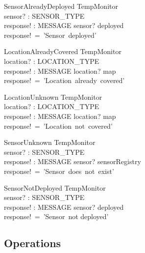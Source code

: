 \documentclass[12pt]{article}
\begin{document}
		
		
		\begin{schema}{SensorAlreadyDeployed}
			\Xi TempMonitor\\
			sensor? : SENSOR\_TYPE\\
			response! : MESSAGE
			\where
			sensor? \in deployed\\
			response!~=~'Sensor~deployed'\\
		\end{schema}
		
		
		
		\begin{schema}{LocationAlreadyCovered}
			\Xi TempMonitor\\
			location? : LOCATION\_TYPE\\
			response! : MESSAGE
			\where
			location? \in \ran map\\
			response!~=~'Location~already~covered'
		\end{schema}
		
		
		
		\begin{schema}{LocationUnknown}
			\Xi TempMonitor\\
			location? : LOCATION\_TYPE\\
			response! : MESSAGE
			\where
			location? \notin \ran map\\
			response!~=~'Location~not~covered'
		\end{schema}



  	    \begin{schema}{SensorUnknown}
			\Xi TempMonitor\\
			sensor? : SENSOR\_TYPE\\
			response! : MESSAGE
			\where
			sensor? \notin sensorRegistry \\
			response!~=~'Sensor~does~not~exist'
		\end{schema}

        \begin{schema}{SensorNotDeployed}
			\Xi TempMonitor\\
			sensor? : SENSOR\_TYPE\\
			response! : MESSAGE
			\where
			sensor? \notin deployed \\
			response!~=~'Sensor~not deployed'
		\end{schema}
		
		
		\subsection{Operations}
		
\end{document}
